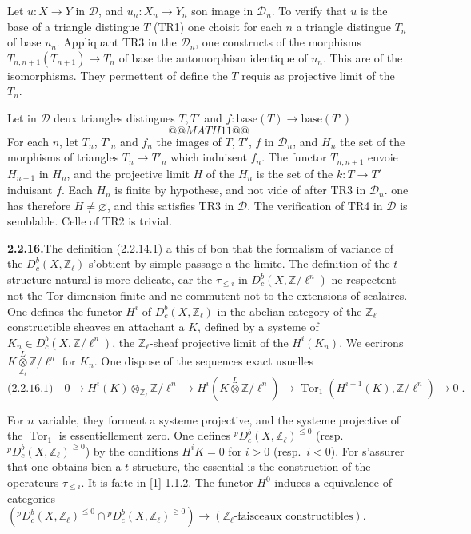 \documentclass[12pt,a4paper]{article}
\theoremstyle{plain}
\theoremstyle{definition}
\DeclareMathOperator{\Tor}{Tor}
\begin{document}
Let $u : X \to Y$ in $\mathcal{D}$, and $u_n : X_n \to Y_n$ son image in $\mathcal{D}_n$. To verify that $u$ is the base of a triangle distingue $T$ (TR1) one choisit for each $n$ a triangle distingue $T_n$ of base $u_n$. Appliquant TR3 in the $\mathcal{D}_n$, one constructs of the morphisms $T_{n,n+1}(T_{n+1}) \to T_n$ of base the automorphism identique of $u_n$. This are of the isomorphisms. They permettent of define the $T$ requis as projective limit of the $T_n$.

Let in $\mathcal{D}$ deux triangles distingues $T, T'$ and $f : \text{base}(T) \to \text{base}(T')$
\[
@@MATH11@@
\]
For each $n$, let $T_n$, $T'_n$ and $f_n$ the images of $T$, $T'$, $f$ in $\mathcal{D}_n$, and $H_n$ the set of the morphisms of triangles $T_n \to T'_n$ which induisent $f_n$. The functor $T_{n,n+1}$ envoie $H_{n+1}$ in $H_n$, and the projective limit $H$ of the $H_n$ is the set of the $k : T \to T'$ induisant $f$. Each $H_n$ is finite by hypothese, and not vide of after TR3 in $\mathcal{D}_n$. one has therefore $H \neq \varnothing$, and this satisfies TR3 in $\mathcal{D}$. The verification of TR4 in $\mathcal{D}$ is semblable. Celle of TR2 is trivial.

\smallskip
\noindent\textbf{2.2.16.}\quad The definition (2.2.14.1) a this of bon that the formalism of variance of the $D_c^b(X, \mathbb{Z}_\ell)$ s'obtient by simple passage a the limite. The definition of the $t$-structure natural is more delicate, car the $\tau_{\leqslant i}$ in $D_c^b(X, \mathbb{Z}/\ell^n)$ ne respectent not the Tor-dimension finite and ne commutent not to the extensions of scalaires. One defines the functor $H^i$ of $D_c^b(X, \mathbb{Z}_\ell)$ in the abelian category of the $\mathbb{Z}_\ell$-constructible sheaves en attachant a $K$, defined by a systeme of $K_n \in D_c^b(X, \mathbb{Z}/\ell^n)$, the $\mathbb{Z}_\ell$-sheaf projective limit of the $H^i(K_n)$. We ecrirons $K \overset{L}{\underset{\mathbb{Z}_\ell}{\otimes}} \mathbb{Z}/\ell^n$ for $K_n$. One dispose of the sequences exact usuelles
\[
\text{(2.2.16.1)}\quad 0 \to H^i(K) \otimes_{\mathbb{Z}_\ell} \mathbb{Z}/\ell^n \to H^i(K \overset{L}{\otimes} \mathbb{Z}/\ell^n) \to \Tor_1(H^{i+1}(K), \mathbb{Z}/\ell^n) \to 0\;.
\]

For $n$ variable, they forment a systeme projective, and the systeme projective of the $\Tor_1$ is essentiellement zero. One defines ${}^p D_c^b(X, \mathbb{Z}_\ell)^{\leqslant 0}$ (resp.\ ${}^p D_c^b(X, \mathbb{Z}_\ell)^{\geqslant 0}$) by the conditions $H^i K = 0$ for $i > 0$ (resp.\ $i < 0$). For s'assurer that one obtains bien a $t$-structure, the essential is the construction of the operateurs $\tau_{\leqslant i}$. It is faite in [1] 1.1.2. The functor $H^0$ induces a equivalence of categories $({}^p D_c^b(X, \mathbb{Z}_\ell)^{\leqslant 0} \cap {}^p D_c^b(X, \mathbb{Z}_\ell)^{\geqslant 0}) \to (\mathbb{Z}_\ell\text{-faisceaux constructibles})$.
\end{document}
